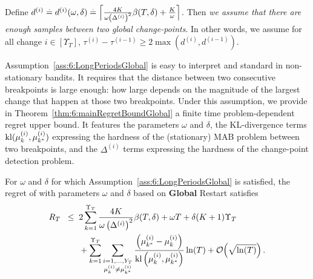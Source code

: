 \begin{assumption}\label{ass:6:LongPeriodsGlobal}
\begin{leftbar}[assumptionbar]  %
    Define
    $d^{(i)} \overset{.}{=} d^{(i)}(\omega,\delta) \overset{.}{=} \Bigl\lceil \frac{4K}{\omega\left(\Delta^{(i)}\right)^2}\beta(T,\delta) + \frac{K}{\omega} \Bigr\rceil$.
    Then \emph{we assume that there are enough samples between two global change-points}.
    In other words, we assume for all change $i \in [\Upsilon_T]$,
    $\tau^{(i)} - \tau^{(i-1)} \geq 2\max (d^{(i)},d^{(i-1)})$.
\end{leftbar}  %
\end{assumption}

Assumption~\ref{ass:6:LongPeriodsGlobal} is easy to interpret and standard in non-stationary bandits.
It requires that the distance between two consecutive breakpoints is large enough: how large depends on the magnitude of the largest change that happen at those two breakpoints.
Under this assumption, we provide in Theorem~\ref{thm:6:mainRegretBoundGlobal} a finite time problem-dependent regret upper bound.
It features the parameters $\omega$ and $\delta$,
the KL-divergence terms $\mathrm{kl}(\mu_k^{(i)},\mu_{k^*}^{(i)})$ expressing the hardness of the (stationary) MAB problem between two breakpoints,
and the $\Delta^{(i)}$ terms expressing the hardness of the change-point detection problem.

\begin{theorem}\label{thm:6:mainRegretBoundGlobal}
\begin{leftbar}[theorembar]  %
    For $\omega$ and $\delta$ for which Assumption~\ref{ass:6:LongPeriodsGlobal} is satisfied, the regret of \GLRklUCB{} with parameters $\omega$ and $\delta$ based on \textbf{Global} Restart satisfies
    \begin{align}
        R_T \;\; \leq \;\; & 2\sum_{k=1}^{\Upsilon_T} \frac{4K}{\omega \left(\Delta^{(i)}\right)^2}\beta(T,\delta) +\omega T + \delta (K+1)\Upsilon_T \\
        & + \sum_{k=1}^{\Upsilon_T}\sum_{\substack{i = 1,\dots,Y_T\\\mu_k^{(i)} \neq \mu_{k^*}^{(i)}}} \frac{\left( \mu_{k^*}^{(i)}-\mu_k^{(i)}\right)}{\mathrm{kl}\left(\mu_k^{(i)},\mu_{k^*}^{(i)}\right)}\ln(T) + \mathop{}\mathopen{}\mathcal{O}\mathopen{}\left(\sqrt{\ln(T)}\right). \nonumber
    \end{align}
\end{leftbar}  %
\end{theorem}


